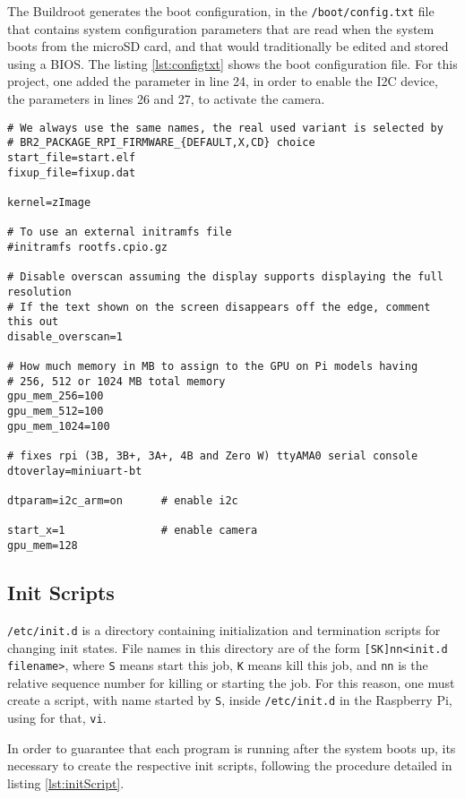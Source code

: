 The Buildroot generates the boot configuration, in the \verb|/boot/config.txt| file that contains system configuration parameters that are read when the system boots from the microSD card, and that would traditionally be edited and stored using a BIOS. \cite{configtxt} The listing \ref{lst:configtxt} shows the boot configuration file. For this project, one added the parameter in line 24, in order to enable the I2C device, the parameters in lines 26 and 27, to activate the camera.

\begin{lstlisting}[caption={/boot/config.txt file.}, label={lst:configtxt}]
# We always use the same names, the real used variant is selected by
# BR2_PACKAGE_RPI_FIRMWARE_{DEFAULT,X,CD} choice
start_file=start.elf
fixup_file=fixup.dat

kernel=zImage

# To use an external initramfs file
#initramfs rootfs.cpio.gz

# Disable overscan assuming the display supports displaying the full resolution
# If the text shown on the screen disappears off the edge, comment this out
disable_overscan=1

# How much memory in MB to assign to the GPU on Pi models having
# 256, 512 or 1024 MB total memory
gpu_mem_256=100
gpu_mem_512=100
gpu_mem_1024=100

# fixes rpi (3B, 3B+, 3A+, 4B and Zero W) ttyAMA0 serial console
dtoverlay=miniuart-bt

dtparam=i2c_arm=on 		# enable i2c

start_x=1             	# enable camera
gpu_mem=128           
\end{lstlisting}

\subsection{Init Scripts}
\verb|/etc/init.d| is a directory containing initialization and termination scripts for changing init states. File names in this directory are of the form \verb|[SK]nn<init.d filename>|, where \verb|S| means start this job, \verb|K| means kill this job, and \verb|nn| is the relative sequence number for killing or starting the job. \cite{initScript} For this reason, one must create a script, with name started by \verb|S|, inside \verb|/etc/init.d| in the Raspberry Pi, using for that, \verb|vi|.

In order to guarantee that each program is running after the system boots up, its necessary to create the respective init scripts, following the procedure detailed in listing \ref{lst:initScript}.

